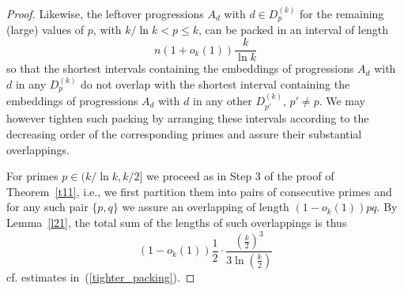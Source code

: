 \documentclass[12pt]{amsart}
\theoremstyle{plain}
\numberwithin{equation}{section}
\begin{document}
\begin{proof}
		Likewise, the leftover progressions $A_d$ with $d\in D_p^{(k)}$ for the remaining (large) values of $p$, with  $k/\ln k<p\leqslant k$, can be packed in an interval of length 
		\begin{equation}\label{WithoutOverlappings}
		n(1+o_k(1))\frac{k}{\ln k}
		\end{equation}
		so that the shortest intervals containing the embeddings of progressions $A_d$ with $d$ in any $D_p^{(k)}$ do not overlap with the shortest interval containing the embeddings of  progressions $A_d$ with $d$ in any other $D_{p'}^{(k)}$, $p'\neq p$. We may however tighten such packing by arranging these intervals according to the decreasing order of the corresponding primes and assure their substantial overlappings.
		
		For primes $p\in (k/\ln k,k/2]$ we proceed as in Step 3 of the proof of Theorem~\ref{t11}, i.e., we first partition them into pairs of consecutive primes and for any such pair $\{p,q\}$ we assure an overlapping of length $(1-o_k(1))pq$. By Lemma~\ref{l21}, the total sum of the lengths of such overlappings is thus
		\begin{equation}\label{FirsttOverlappings}
		(1-o_k(1))\frac{1}{2}\cdot \frac{\left(\frac{k}{2}\right)^3}{3\ln \left(\frac{k}{2}\right)} 
		\end{equation}
		cf. estimates in~(\ref{tighter_packing}).
		

\end{proof}
\end{document}
